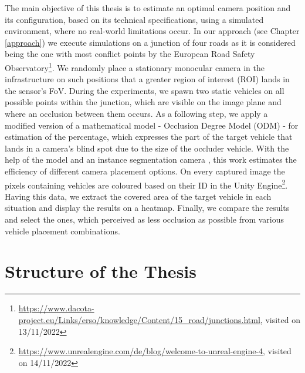 The main objective of this thesis is to estimate an optimal camera position and its configuration, based on its technical specifications, using a simulated environment, where no real-world limitations occur. In our approach (see Chapter \ref{approach}) we execute simulations on a junction of four roads as it is considered being the one with most conflict points by the European Road Safety Observatory\footnote{\url{https://www.dacota-project.eu/Links/erso/knowledge/Content/15_road/junctions.html}, visited on 13/11/2022}. We randomly place a stationary monocular camera in the infrastructure on such positions that a greater region of interest (ROI) lands in the sensor's FoV. During the experiments, we spawn two static vehicles on all possible points within the junction, which are visible on the image plane and where an occlusion between them occurs. As a following step, we apply a modified version of a mathematical model - Occlusion Degree Model (ODM) \cite{occlusion_degree_model} - for estimation of the percentage, which expresses the part of the target vehicle that lands in a camera's blind spot due to the size of the occluder vehicle. With the help of the model and an instance segmentation camera \cite{instance_segmenatation_cam}, this work estimates the efficiency of different camera placement options. On every captured image the pixels containing vehicles are coloured based on their ID in the Unity Engine\footnote{\url{https://www.unrealengine.com/de/blog/welcome-to-unreal-engine-4}, visited on 14/11/2022}. Having this data, we extract the covered area of the target vehicle in each situation and display the results on a heatmap. Finally, we compare the results and select the ones, which perceived as less occlusion as possible from various vehicle placement combinations. 
\newpage

\section{Structure of the Thesis}


